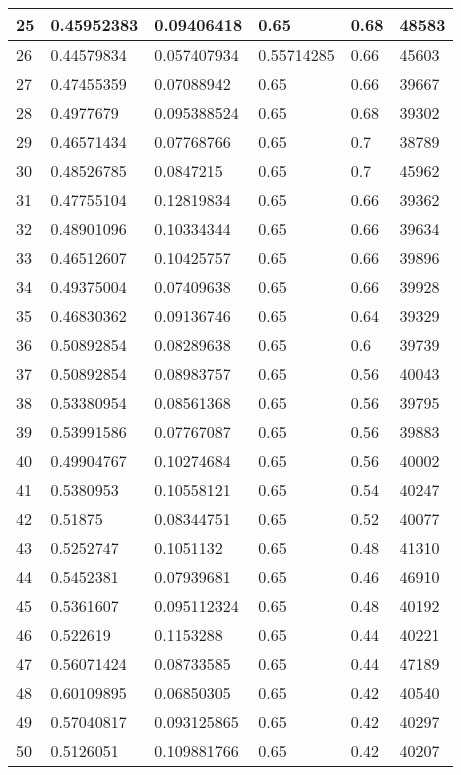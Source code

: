 \begin{longtable}{|l|l|l|l|l|l|}
25 & 0.45952383 & 0.09406418 & 0.65 & 0.68 & 48583 \\ \hline 
26 & 0.44579834 & 0.057407934 & 0.55714285 & 0.66 & 45603 \\ \hline 
27 & 0.47455359 & 0.07088942 & 0.65 & 0.66 & 39667 \\ \hline 
28 & 0.4977679 & 0.095388524 & 0.65 & 0.68 & 39302 \\ \hline 
29 & 0.46571434 & 0.07768766 & 0.65 & 0.7 & 38789 \\ \hline 
30 & 0.48526785 & 0.0847215 & 0.65 & 0.7 & 45962 \\ \hline 
31 & 0.47755104 & 0.12819834 & 0.65 & 0.66 & 39362 \\ \hline 
32 & 0.48901096 & 0.10334344 & 0.65 & 0.66 & 39634 \\ \hline 
33 & 0.46512607 & 0.10425757 & 0.65 & 0.66 & 39896 \\ \hline 
34 & 0.49375004 & 0.07409638 & 0.65 & 0.66 & 39928 \\ \hline 
35 & 0.46830362 & 0.09136746 & 0.65 & 0.64 & 39329 \\ \hline 
36 & 0.50892854 & 0.08289638 & 0.65 & 0.6 & 39739 \\ \hline 
37 & 0.50892854 & 0.08983757 & 0.65 & 0.56 & 40043 \\ \hline 
38 & 0.53380954 & 0.08561368 & 0.65 & 0.56 & 39795 \\ \hline 
39 & 0.53991586 & 0.07767087 & 0.65 & 0.56 & 39883 \\ \hline 
40 & 0.49904767 & 0.10274684 & 0.65 & 0.56 & 40002 \\ \hline 
41 & 0.5380953 & 0.10558121 & 0.65 & 0.54 & 40247 \\ \hline 
42 & 0.51875 & 0.08344751 & 0.65 & 0.52 & 40077 \\ \hline 
43 & 0.5252747 & 0.1051132 & 0.65 & 0.48 & 41310 \\ \hline 
44 & 0.5452381 & 0.07939681 & 0.65 & 0.46 & 46910 \\ \hline 
45 & 0.5361607 & 0.095112324 & 0.65 & 0.48 & 40192 \\ \hline 
46 & 0.522619 & 0.1153288 & 0.65 & 0.44 & 40221 \\ \hline 
47 & 0.56071424 & 0.08733585 & 0.65 & 0.44 & 47189 \\ \hline 
48 & 0.60109895 & 0.06850305 & 0.65 & 0.42 & 40540 \\ \hline 
49 & 0.57040817 & 0.093125865 & 0.65 & 0.42 & 40297 \\ \hline 
50 & 0.5126051 & 0.109881766 & 0.65 & 0.42 & 40207 \\ \hline 
\end{longtable}